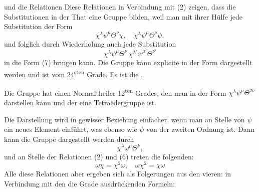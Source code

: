 
und die Relationen
Diese Relationen in Verbindung mit (2) zeigen, dass die
Substitutionen
in der That eine Gruppe bilden, weil man mit ihrer Hülfe jede
Substitution der Form
\[
\chi^{\lambda}\psi^{\mu}\Theta^{\nu}\chi, \quad \chi^{\lambda}\psi^{\mu}\Theta^{\nu}\psi,
\]
und folglich durch Wiederholung auch jede Substitution
\[
\chi^{\lambda}\psi^{\mu}\Theta^{\nu}\,\chi^{\lambda'}\psi^{\mu'}\Theta^{\nu'}
\]
in die Form (7) bringen kann. Die Gruppe kann explicite in
der Form
dargestellt werden und ist vom 24\textsuperscript{sten} Grade. Es ist die
.

Die Gruppe hat einen Normaltheiler 12\textsuperscript{ten} Grades, den man
in der Form $\chi^{\lambda}\psi^{\mu}\Theta^{2\nu}$ darstellen kann und der eine
Tetraëdergruppe ist.

Die Darstellung wird in gewisser Beziehung einfacher, wenn
man an Stelle von $\psi$ ein neues Element
einführt, was ebenso wie $\psi$ von der zweiten Ordnung ist. Dann
kann die Gruppe dargestellt werden durch
\[
\chi^{\lambda}\omega^{\mu}\Theta^{\nu},
\]
und an Stelle der Relationen (2) und (6) treten die folgenden:
\[
\omega\chi = \chi^2\omega, \quad \omega\chi^2 = \chi\omega
\]
Alle diese Relationen aber ergeben sich als Folgerungen
aus den vieren:
in Verbindung mit den die Grade ausdrückenden Formeln:

